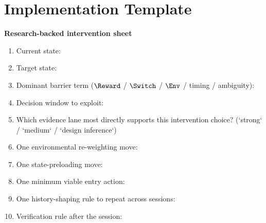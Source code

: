 \section{Implementation Template}

\begin{templatebox}
\textbf{Research-backed intervention sheet}
\begin{enumerate}[nosep]
  \item Current state:
  \item Target state:
  \item Dominant barrier term ($\Reward$ / $\Switch$ / $\Env$ / timing / ambiguity):
  \item Decision window to exploit:
  \item Which evidence lane most directly supports this intervention choice?
        (`strong` / `medium` / `design inference`)
  \item One environmental re-weighting move:
  \item One state-preloading move:
  \item One minimum viable entry action:
  \item One history-shaping rule to repeat across sessions:
  \item Verification rule after the session:
\end{enumerate}
\end{templatebox}
